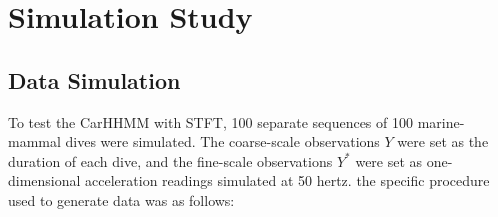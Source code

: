 
\section{Simulation Study}

\subsection{Data Simulation}


To test the CarHHMM with STFT, 100 separate sequences of 100 marine-mammal dives were simulated. The coarse-scale observations $Y$ were set as the duration of each dive, and the fine-scale observations $Y^*$ were set as one-dimensional acceleration readings simulated at 50 hertz. the specific procedure used to generate data was as follows: 

